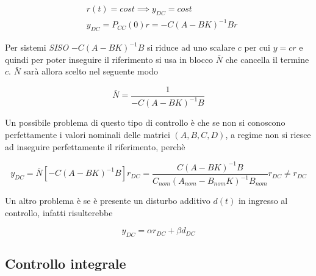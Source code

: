		\begin{align*}
			&r(t)=cost \implies y_{DC}=cost \\
			&y_{DC}=P_{CC}(0)r=-C(A-BK)^{-1}Br
		\end{align*} 
		
		\noindent Per sistemi \textit{SISO} $-C(A-BK)^{-1}B$ si riduce ad uno scalare $c$ per cui $y=cr$ e quindi per poter inseguire il riferimento si usa in blocco $\bar{N}$ che cancella il termine $c$. $\bar{N}$ sarà allora scelto nel seguente modo
		
		\begin{equation}
			\bar{N} = \frac{1}{-C(A-BK)^{-1}B}
			\label{eq:Nbarra}
		\end{equation}
		
		\noindent Un possibile problema di questo tipo di controllo è che se non si conoscono perfettamente i valori nominali delle matrici $(A,B,C,D)$, a regime non si riesce ad inseguire perfettamente il riferimento, perchè
		
		\begin{equation}
			y_{DC}=\bar{N}[-C(A-BK)^{-1}B]r_{DC}=\frac{C(A-BK)^{-1}B}{C_{nom}(A_{nom}-B_{nom}K)^{-1}B_{nom}}r_{DC} \ne r_{DC}
		\end{equation}
		
		\noindent Un altro problema è se è presente un disturbo additivo $d(t)$ in ingresso al controllo, infatti risulterebbe
		
		\begin{equation}
			y_{DC}=\alpha r_{DC} + \beta d_{DC}
		\end{equation} 
		
		
		
		
		
		
		
	\subsection{Controllo integrale}
	\label{subsec:ControlloIntegrale}
	
